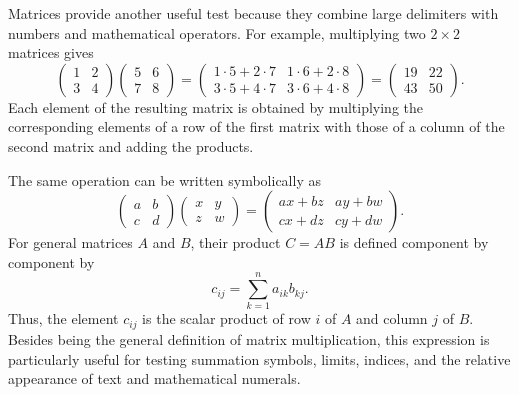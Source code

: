 \documentclass[
11pt,
a4paper,
oneside
]{scrbook}
\begin{document}
Matrices provide another useful test because they combine large delimiters
with numbers and mathematical operators. For example, multiplying two
$2\times2$ matrices gives
\begin{equation}
	\begin{pmatrix}
		1 & 2 \\
		3 & 4
	\end{pmatrix}
	\begin{pmatrix}
		5 & 6 \\
		7 & 8
	\end{pmatrix}
	=
	\begin{pmatrix}
		1\cdot5+2\cdot7 & 1\cdot6+2\cdot8 \\
		3\cdot5+4\cdot7 & 3\cdot6+4\cdot8
	\end{pmatrix}
	=
	\begin{pmatrix}
		19 & 22 \\
		43 & 50
	\end{pmatrix}.
	\label{eq:matrix-multiplication-numeric}
\end{equation}
Each element of the resulting matrix is obtained by multiplying the
corresponding elements of a row of the first matrix with those of a column
of the second matrix and adding the products.

The same operation can be written symbolically as
\begin{equation}
	\begin{pmatrix}
		a & b \\
		c & d
	\end{pmatrix}
	\begin{pmatrix}
		x & y \\
		z & w
	\end{pmatrix}
	=
	\begin{pmatrix}
		ax+bz & ay+bw \\
		cx+dz & cy+dw
	\end{pmatrix}.
	\label{eq:matrix-multiplication-symbolic}
\end{equation}
For general matrices $A$ and $B$, their product $C=AB$ is defined
component by component by
\begin{equation}
	c_{ij}
	=
	\sum_{k=1}^{n} a_{ik}b_{kj}.
	\label{eq:matrix-multiplication-general}
\end{equation}
Thus, the element $c_{ij}$ is the scalar product of row $i$ of $A$ and
column $j$ of $B$. Besides being the general definition of matrix
multiplication, this expression is particularly useful for testing
summation symbols, limits, indices, and the relative appearance of
text and mathematical numerals.
\end{document}
